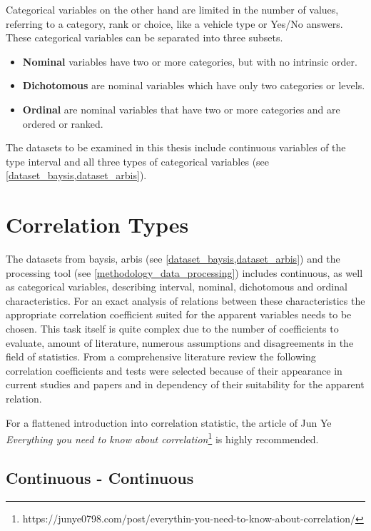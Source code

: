 Categorical variables on the other hand are limited in the number of values, referring to a category, rank or choice, like a vehicle type or Yes/No answers. These categorical variables can be separated into three subsets.

\begin{itemize}
	\item \textbf{Nominal} variables have two or more categories, but with no intrinsic order. \parencite{Laerd2020}
	\item \textbf{Dichotomous} are nominal variables which have only two categories or levels. \parencite{Laerd2020}
    \item \textbf{Ordinal} are nominal variables that have two or more categories and are ordered or ranked. \parencite{Laerd2020}
\end{itemize}

The datasets to be examined in this thesis include continuous variables of the type interval and all three types of categorical variables (see \cref{dataset_baysis,dataset_arbis}).

\section{Correlation Types}
\label{correlation_coefficient_types}
The datasets from \acrshort{baysis}, \acrshort{arbis} (see \cref{dataset_baysis,dataset_arbis}) and the processing tool (see \cref{methodology_data_processing}) includes continuous, as well as categorical variables, describing interval, nominal, dichotomous and ordinal characteristics. For an exact analysis of relations between these characteristics the appropriate correlation coefficient suited for the apparent variables needs to be chosen. This task itself is quite complex due to the number of coefficients to evaluate, amount of literature, numerous assumptions and disagreements in the field of statistics. From a comprehensive literature review the following correlation coefficients and tests were selected because of their appearance in current studies and papers and in dependency of their suitability for the apparent relation.

For a flattened introduction into correlation statistic, the article of Jun Ye \textit{Everything you need to know about correlation}\footnote{https://junye0798.com/post/everythin-you-need-to-know-about-correlation/} is highly recommended. \parencite{Yun2020}

\subsection{Continuous - Continuous}
\label{correlation_pearson}

